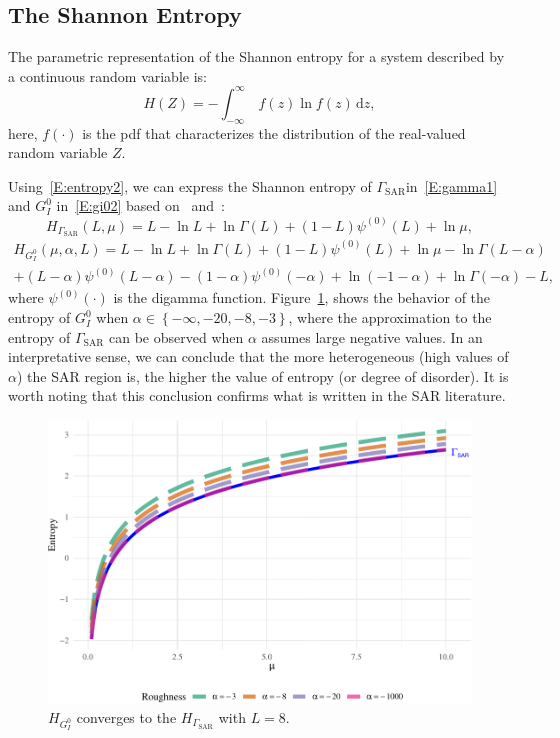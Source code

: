 \documentclass[remotesensing,article,submit,moreauthors,pdftex]{Definitions/mdpi}
\begin{document}
\hypertarget{the-shannon-entropy}{%
\subsection{The Shannon Entropy}\label{the-shannon-entropy}}

The parametric representation of the Shannon entropy for a system described by a continuous random variable is:
\begin{equation}
  \label{E:entropy2}
  H(Z)=-\int_{-\infty }^\infty \ f(z)\ln f(z)\, \mathrm{d}z,
\end{equation} 
here, \(f(\cdot)\) is the pdf
that characterizes the distribution of the real-valued random variable
\(Z\).

Using~\eqref{E:entropy2}, we can express the Shannon entropy of
\(\Gamma_{\text{SAR}}\)in~\eqref{E:gamma1} and \(G_I^0\)
in~\eqref{E:gi02} based on~\cite{Cassetti2022} and~\cite{Ferreira2020}:
\begin{equation}
\label{E:E-gamma}
H_{\Gamma_{\text{SAR}}}(L, \mu) =   L -\ln L+\ln\Gamma(L)+(1-L)\psi^{(0)}(L) + \ln \mu, 
\end{equation} \begin{multline}
\label{E:E-GIO}
H_{G_I^0}(\mu, \alpha, L) =L -\ln L+\ln\Gamma(L)+(1-L)\psi^{(0)}(L) +\ln \mu -\ln\Gamma(L-\alpha)\\
+ (L-\alpha) \psi^{(0)}(L-\alpha)-(1-\alpha)\psi^{(0)}(-\alpha)+\ln (-1-\alpha)+\ln\Gamma(-\alpha)-L,
\end{multline} where \(\psi^{(0)}(\cdot)\) is the digamma function.
Figure~\ref{fig:Plot_GI0_to_gamma1}, shows the behavior of the entropy of \(G_I^0\) when
\(\alpha \in \left\{-\infty, -20, -8, -3\right\}\), where the approximation to the entropy of \(\Gamma_{\text{SAR}}\) can be observed when \(\alpha\)
assumes large negative values.
In an interpretative sense, we can conclude that the more heterogeneous (high values of $\alpha$) the SAR region is, the higher the value of entropy (or degree of disorder).
It is worth noting that this conclusion confirms what is written in the SAR literature.


\begin{figure}[hbt]
\includegraphics[width=0.7\linewidth]{Identifying-Heterogeneity-in-SAR-Data-with-New-Test-Statistics_files/figure-latex/Plot_GI0_to_gamma1-1} \caption{$H_{ G_I^0}$ converges to the $H_{\Gamma_{\text{SAR}}}$ with $L=8$.}\label{fig:Plot_GI0_to_gamma1}
\end{figure}
\end{document}
